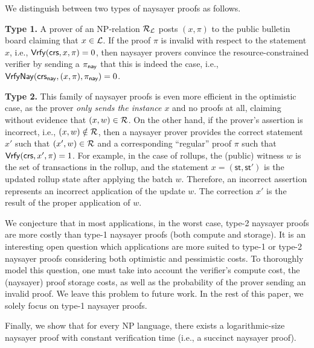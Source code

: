 We distinguish between two types of naysayer proofs as follows.
\begin{description}
    \item \textbf{Type 1.} A prover of an NP-relation $\mathcal{R}_{\mathcal{L}}$ posts $(x,\pi)$ to the public bulletin board claiming that $x \in \mathcal{L}$. If the proof $\pi$ is invalid with respect to the statement $x$, i.e., $\mathsf{Vrfy}(\mathsf{crs}, x,\pi)=0$, then naysayer provers convince the resource-constrained verifier by sending a $\pi_{\mathsf{nay}}$ that this is indeed the case, i.e., ${\mathsf{Vrfy}}\mathsf{Nay}(\mathsf{crs}_{\mathsf{nay}}, (x,\pi), \pi_{\mathsf{nay}})=0$. 
    \item \textbf{Type 2.} This family of naysayer proofs is even more efficient in the optimistic case, as the prover \emph{only sends the instance $x$} and no proofs at all, claiming without evidence that $(x,w) \in \mathcal{R}$. On the other hand, if the prover's assertion is incorrect, i.e., $(x,w) \notin \mathcal{R}$, then a naysayer prover provides the correct statement $x'$ such that $(x',w) \in \mathcal{R}$ 
    and a corresponding ``regular'' proof $\pi$ such that $\mathsf{Vrfy}(\mathsf{crs}, x', \pi) = 1$. For example, in the case of rollups, the (public) witness $w$ is the set of transactions in the rollup, and the statement $x = (\mathsf{st}, \mathsf{st}')$ is the updated rollup state after applying the batch $w$. Therefore, an incorrect assertion represents an incorrect application of the update $w$. The correction $x'$ is the result of the proper application of $w$.
\end{description}
We conjecture that in most applications, in the worst case, type-2 naysayer proofs are more costly than type-1 naysayer proofs (both compute and storage).
It is an interesting open question which applications are more suited to type-1 or type-2 naysayer proofs considering both optimistic and pessimistic costs. To thoroughly model this question, one must take into account the verifier's compute cost, the (naysayer) proof storage costs, as well as the probability of the prover sending an invalid proof. We leave this problem to future work.
In the rest of this paper, we solely focus on type-1 naysayer proofs.

Finally, we show that for every NP language, there exists a logarithmic-size naysayer proof with constant verification time (i.e., a succinct naysayer proof). %

